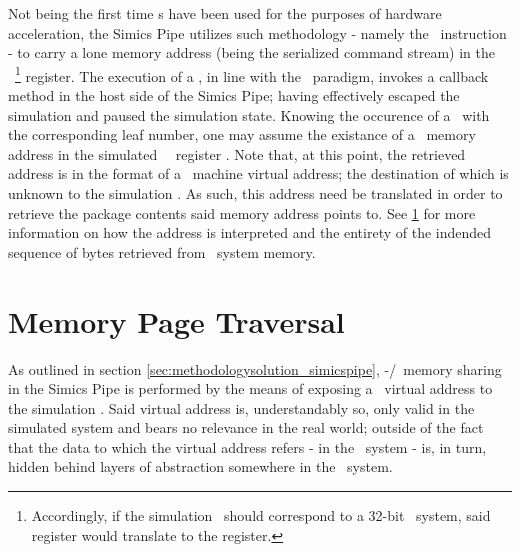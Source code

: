 Not being the first time \dvttermmagicinstruction s have been used for the purposes of hardware acceleration, the Simics Pipe utilizes such methodology - namely the  \dvttermxeightysix\ instruction - to carry a lone memory address (being the serialized command stream) in the \dvttermtarget\ \footnote{Accordingly, if the simulation \dvttermtarget\ should correspond to a 32-bit \dvttermxeightysix\ system, said register would translate to the  register.} register.
The execution of a \dvttermmagicinstruction , in line with the \dvttermmagicinstruction\ paradigm, invokes a callback method in the host side of the Simics Pipe; having effectively escaped the simulation and paused the simulation state.
Knowing the occurence of a \dvttermmagicinstruction\ with the corresponding leaf number, one may assume the existance of a \dvttermtarget\ memory address in the simulated \dvttermtarget\ \dvttermcpu\ register .
Note that, at this point, the retrieved address is in the format of a \dvttermtarget\ machine virtual address; the destination of which is unknown to the simulation \dvttermhost .
As such, this address need be translated in order to retrieve the package contents said memory address points to.
See \ref{sec:methodologysolution_memorypagetraversal} for more information on how the address is interpreted and the entirety of the indended sequence of bytes retrieved from \dvttermhost\ system memory.


\section{Memory Page Traversal}
\label{sec:methodologysolution_memorypagetraversal}
As outlined in section \ref{sec:methodologysolution_simicspipe}, \dvttermtarget -/\dvttermhost\ memory sharing in the Simics Pipe is performed by the means of exposing a \dvttermtarget\ virtual address to the simulation \dvttermhost .
Said virtual address is, understandably so, only valid in the simulated system and bears no relevance in the real world; outside of the fact that the data to which the virtual address refers - in the \dvttermtarget\ system - is, in turn, hidden behind layers of abstraction somewhere in the \dvttermhost\ system.

